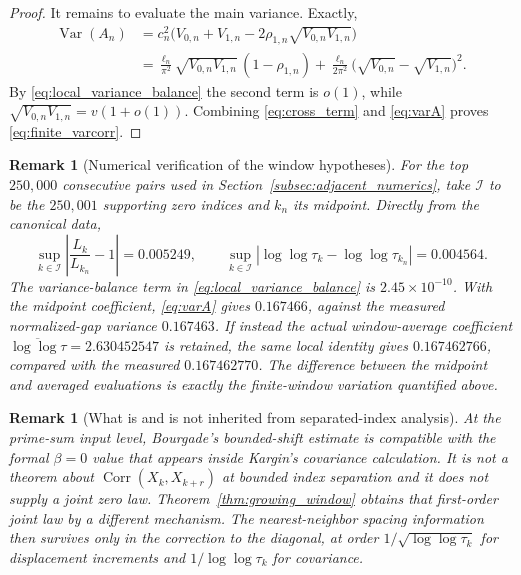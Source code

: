 \documentclass[pdflatex,sn-mathphys-num]{sn-jnl}
\numberwithin{equation}{section}
\theoremstyle{thmstyleone}
\theoremstyle{thmstylethree}
\theoremstyle{thmstyletwo}
\newtheorem{remark}[theorem]{Remark}
\newcommand{\Var}{\operatorname{Var}}
\newcommand{\Corr}{\operatorname{Corr}}
\newcommand{\1}{\mathbf 1}
\begin{document}
\begin{proof}
It remains to evaluate the main variance.  Exactly,
\begin{align}
 \Var(A_n)
 &=c_n^2\bigl(V_{0,n}+V_{1,n}
       -2\rho_{1,n}\sqrt{V_{0,n}V_{1,n}}\bigr)\\
 &=\frac{\ell_n}{\pi^2}\sqrt{V_{0,n}V_{1,n}}\,(1-\rho_{1,n})
 +\frac{\ell_n}{2\pi^2}
  \bigl(\sqrt{V_{0,n}}-\sqrt{V_{1,n}}\bigr)^2.
\label{eq:varA}
\end{align}
By \eqref{eq:local_variance_balance} the second term is $o(1)$, while
$\sqrt{V_{0,n}V_{1,n}}=v(1+o(1))$.  Combining
\eqref{eq:cross_term} and \eqref{eq:varA} proves
\eqref{eq:finite_varcorr}.
\end{proof}

\begin{remark}[Numerical verification of the window hypotheses]
For the top $250{,}000$ consecutive pairs used in
Section~\ref{subsec:adjacent_numerics}, take $\mathcal I$ to be the
$250{,}001$ supporting zero indices and $k_n$ its midpoint.  Directly from the
canonical data,
\[
 \sup_{k\in\mathcal I}\left|\frac{L_k}{L_{k_n}}-1\right|
 =0.005249,
 \qquad
 \sup_{k\in\mathcal I}
 \left|\log\log\tau_k-\log\log\tau_{k_n}\right|
 =0.004564.
\]
The variance-balance term in \eqref{eq:local_variance_balance} is
$2.45\times10^{-10}$.  With the midpoint coefficient,
\eqref{eq:varA} gives $0.167466$, against the measured normalized-gap variance
$0.167463$.  If instead the actual window-average coefficient
$\overline{\log\log\tau}=2.630452547$ is retained, the same local identity
gives $0.167462766$, compared with the measured $0.167462770$.  The difference
between the midpoint and averaged evaluations is exactly the finite-window
variation quantified above.
\end{remark}

\begin{remark}[What is and is not inherited from separated-index analysis]
At the prime-sum input level, Bourgade's bounded-shift estimate
\cite{Bourgade2010} is compatible with the formal \(\beta=0\) value that appears
inside Kargin's covariance calculation.  It is not a theorem about
\(\Corr(X_k,X_{k+r})\) at bounded index separation and it does not supply a
joint zero law.  Theorem~\ref{thm:growing_window} obtains that first-order joint
law by a different mechanism.  The nearest-neighbor spacing information then
survives only in the correction to the diagonal, at order
\(1/\sqrt{\log\log\tau_k}\) for displacement increments and
\(1/\log\log\tau_k\) for covariance.
\end{remark}
\end{document}
